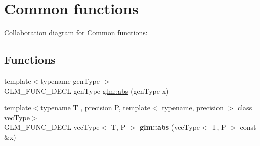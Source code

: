 \hypertarget{group__core__func__common}{\section{Common functions}
\label{group__core__func__common}
}
Collaboration diagram for Common functions\-:
\subsection*{Functions}
\begin{DoxyCompactItemize}
\item 
{\footnotesize template$<$typename gen\-Type $>$ }\\G\-L\-M\-\_\-\-F\-U\-N\-C\-\_\-\-D\-E\-C\-L gen\-Type \hyperlink{group__core__func__common_ga693d77696ff36572a0da79efec965acd}{glm\-::abs} (gen\-Type x)
\item 
\hypertarget{group__core__func__common_ga4e8c1187dff84385308245090d440b35}{{\footnotesize template$<$typename T , precision P, template$<$ typename, precision $>$ class vec\-Type$>$ }\\G\-L\-M\-\_\-\-F\-U\-N\-C\-\_\-\-D\-E\-C\-L vec\-Type$<$ T, P $>$ {\bfseries glm\-::abs} (vec\-Type$<$ T, P $>$ const \&x)}\label{group__core__func__common_ga4e8c1187dff84385308245090d440b35}


\end{DoxyCompactItemize}
